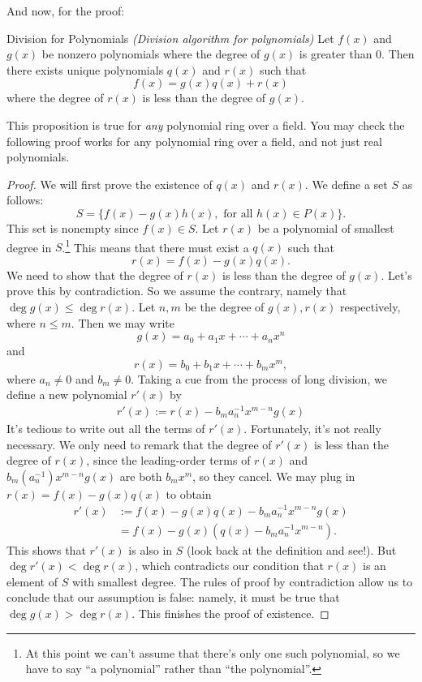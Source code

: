 And now, for the proof:

\begin {prop} {Division for Polynomials} \emph{(Division algorithm for polynomials)}
Let $f(x)$ and $g(x)$ be nonzero polynomials where the degree of $g(x)$ is greater than 0.  Then there exists unique polynomials $q(x)$ and $r(x)$ such that 
\[
f(x) = g(x)q(x) + r(x)
\]
where the degree of $r(x)$ is less than the degree of $g(x)$.
\end {prop}

\begin {rem}
This proposition is true for \emph{any} polynomial ring over a field. You may check the following proof works for any polynomial ring over a field, and not just real polynomials.
\end{rem}


\begin{proof}
We will first prove the existence of $q(x)$ and $r(x)$. We define a set $S$ as follows: 
\[S = \{f(x) - g(x) h(x), \text{ for all } h(x) \in P(x) \}.\] 
 This set is nonempty since $f(x) \in
S$. 
Let
$r(x)$ be  a polynomial of smallest degree in $S$.\footnote{At this point we can't assume that there's only one such polynomial, so we have to say ``a polynomial'' rather than ``the polynomial''.} This means that there must exist a $q(x)$ such that  
\[
r(x) = f(x) - g(x) q(x).
\]
We need to show that the degree of $r(x)$ is less than the degree of
$g(x)$. Let's prove this by contradiction. So we assume the contrary, namely  that $\deg g(x) \leq \deg r(x)$. 
Let $n,m$ be the degree of $g(x),r(x)$ respectively, where $n \leq m$. Then we may write
\[
g(x) = a_0 + a_1 x + \cdots + a_n x^n
\]
and
\[
r(x) = b_0 + b_1 
x + \cdots + b_m x^m, \]
where $a_n \neq 0$ and $b_m \neq 0$. 
Taking a cue from the process of long division, we define a new polynomial $r'(x)$ by
\begin{align*}
r'(x) := r(x) - b_m a_n^{-1} x^{m-n}g(x)
\end{align*}
It's tedious to write out all the terms of $r'(x)$. Fortunately, it's not really necessary. We only need to remark that the degree of $r'(x)$ is less than the degree of $r(x)$, since the leading-order terms of $r(x)$ and $b_m(a_n^{-1}) x^{m-n}g(x)$ are both $b_m x^m$, so they cancel. We may plug in $r(x) = f(x) - g(x) q(x)$ to obtain
\begin{align*}
r'(x) &:=  f(x) - g(x) q(x) - b_m a_n^{-1}  x^{m-n}g(x)\\
&= f(x) - g(x) \left( q(x) - b_m a_n^{-1}  x^{m-n}\right).
\end{align*}
This shows that $r'(x)$ is also in $S$  (look back at the definition and see!).  But 
$\deg r'(x) < \deg r(x)$, which contradicts our condition that $r(x)$ is an element of $S$ with smallest degree. The rules of proof by contradiction allow us to conclude that our assumption is false: namely, it must be true that $\deg g(x) > \deg r(x)$.
This finishes the proof of existence.


\end{proof}
